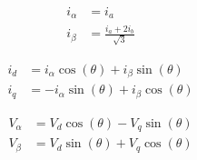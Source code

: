 \documentclass[11pt]{report}
\begin{document}

\begin{align*}
	i_{\alpha} & = i_a                         \\
	i_{\beta}  & = \frac{i_a + 2i_b}{\sqrt{3}}
\end{align*}

\begin{align*}
	i_d & = i_{\alpha} \cos(\theta) + i_{\beta} \sin(\theta)  \\
	i_q & = -i_{\alpha} \sin(\theta) + i_{\beta} \cos(\theta)
\end{align*}


\begin{align*}
	V_{\alpha} & = V_d \cos(\theta) - V_q \sin(\theta) \\
	V_{\beta}  & = V_d \sin(\theta) + V_q \cos(\theta)
\end{align*}
\end{document}
